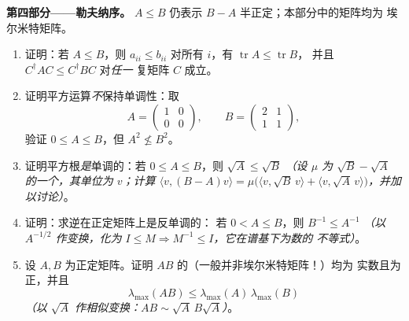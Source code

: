 \begin{problem}
\medskip
\noindent\textbf{第四部分——勒夫纳序。} $A \leq B$
仍表示 $B - A$ 半正定；本部分中的矩阵均为
埃尔米特矩阵。
\begin{enumerate}[resume]
  \item 证明：若 $A \leq B$，则 $a_{ii} \leq b_{ii}$ 对所有
        $i$，有 $\operatorname{tr} A \leq \operatorname{tr} B$，
        并且 $C^\dagger AC \leq C^\dagger BC$ 对\emph{任一}
        复矩阵 $C$ 成立。
  \item 证明平方运算\emph{不}保持单调性：取
        \[
        A = \begin{pmatrix} 1 & 0\\ 0 & 0\end{pmatrix},
        \qquad
        B = \begin{pmatrix} 2 & 1\\ 1 & 1\end{pmatrix},
        \]
        验证 $0 \leq A \leq B$，但 $A^2 \not\leq B^2$。
  \item 证明平方根\emph{是}单调的：若 $0 \leq
        A \leq B$，则 $\sqrt A \leq \sqrt B$ \emph{（设
        $\mu$ 为 $\sqrt B - \sqrt A$ 的一个，其单位为
        $v$；计算 $\langle v, (B - A)v\rangle =
        \mu\bigl(\langle v, \sqrt B\,v\rangle + \langle v,
        \sqrt A\,v\rangle\bigr)$，并加以讨论）}。
  \item 证明：求逆在正定矩阵上是反单调的：
        若 $0 < A \leq B$，则 $B^{-1} \leq A^{-1}$
        \emph{（以 $A^{-1/2}$ 作变换，化为 $I \leq M
        \Rightarrow M^{-1} \leq I$，它在谱基下为数的
        不等式）}。
  \item 设 $A, B$ 为正定矩阵。证明
        $AB$ 的（一般并非埃尔米特矩阵！）均为
        实数且为正，并且
        \[
        \lambda_{\max}(AB) \leq
        \lambda_{\max}(A)\,\lambda_{\max}(B)
        \]
        \emph{（以 $\sqrt A$ 作相似变换：$AB \sim \sqrt
        A\,B\sqrt A$）}。
\end{enumerate}


\end{problem}
